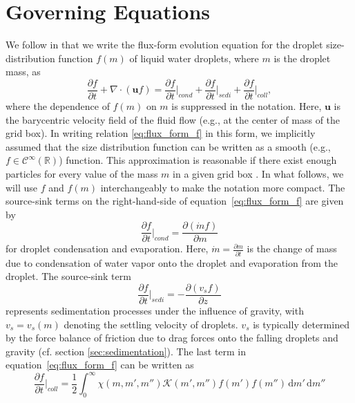 \documentclass{report}
\begin{document}
\section{Governing Equations}
We follow \citep{} in that we write the flux-form evolution equation for the droplet size-distribution function $f(m)$ of liquid water droplets, where $m$ is the droplet mass, as 
\begin{equation}
    \frac{\partial f}{\partial t} +\nabla \cdot (\mathbf{u} f) = \frac{\partial f}{\partial t} \biggr\rvert_{cond} + \frac{\partial f}{\partial t} \biggr\rvert_{sedi} + \frac{\partial f}{\partial t} \biggr\rvert_{coll}, 
    \label{eq:flux_form_f}
\end{equation}
where the dependence of $f(m)$ on $m$ is suppressed in the notation. Here, $\mathbf{u}$ is the barycentric velocity field of the fluid flow (e.g., at the center of mass of the grid box). In writing relation \eqref{eq:flux_form_f} in this form, we implicitly assumed that the size distribution function can be written as a smooth (e.g., $f \in \mathcal{C}^\infty(\mathbb{R})$) function. This approximation is reasonable if there exist enough particles for every value of the mass $m$ in a given grid box \citep[cf.][]{Beheng10}. In what follows, we will use $f$ and $f(m)$ interchangeably to make the notation more compact. The source-sink terms on the right-hand-side of equation~\eqref{eq:flux_form_f} are given by
\begin{equation}
    \frac{\partial f}{\partial t} \biggr\rvert_{cond} = \frac{\partial (\dot{m} f)}{\partial m}
    \label{eq:source_evap}
\end{equation}
for droplet condensation and evaporation. Here, $\dot{m} = \frac{\partial m}{\partial t}$ is the change of mass due to condensation of water vapor onto the droplet and evaporation from the droplet. The source-sink term 
\begin{equation}
    \frac{\partial f}{\partial t} \biggr\rvert_{sedi} = -\frac{\partial(v_sf)}{\partial z}
    \label{eq:source_sedi}
\end{equation}
represents sedimentation processes under the influence of gravity, with $v_s = v_s(m)$ denoting the settling velocity of droplets. $v_s$ is typically determined by the force balance of friction due to drag forces onto the falling droplets and gravity (cf. section \ref{sec:sedimentation}). The last term in equation~\eqref{eq:flux_form_f} can be written as
\begin{equation}
    \frac{\partial f}{\partial t} \biggr\rvert_{coll} = \frac{1}{2} \int_0^\infty \chi(m,m',m'') \mathcal{K}(m', m'')f(m')f(m'') \,\text{d}m' \, \text{d}{m''}
    \label{eq:source_cb}
\end{equation}
\end{document}
